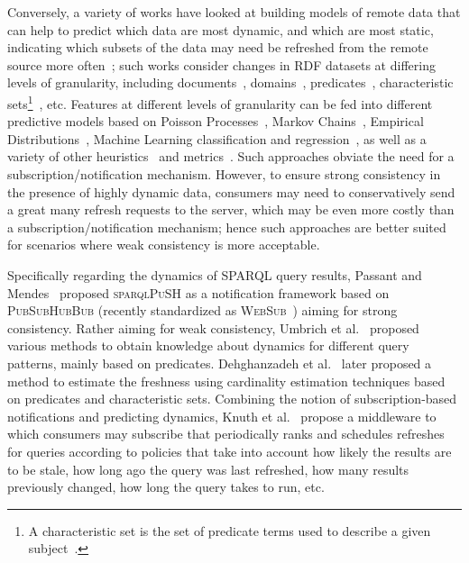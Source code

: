 \documentclass[runningheads]{llncs}
\begin{document}
Conversely, a variety of works have looked at building models of remote data that can help to predict which data are most dynamic, and which are most static, indicating which subsets of the data may need be refreshed from the remote source more often~\cite{PassantM10,TrampFEA10,UmbrichHHPD10,UmbrichKL10,KaferAUOH13,DividinoSGG13,NishiokaS16,GonzalezH18}; such works consider changes in RDF datasets at differing levels of granularity, including documents~\cite{KaferAUOH13}, domains~\cite{KaferAUOH13,NishiokaS16,NishiokaS17}, predicates~\cite{KaferAUOH13,NishiokaS17}, characteristic sets\footnote{A characteristic set is the set of predicate terms used to describe a given subject~\cite{NeumannM11}.}~\cite{NishiokaS16,GonzalezH18}, etc. Features at different levels of granularity can be fed into different predictive models based on Poisson Processes~\cite{UmbrichHHPD10}, Markov Chains~\cite{UmbrichMP15}, Empirical Distributions~\cite{NeumaierU16}, Machine Learning classification and regression~\cite{NishiokaS17,GonzalezH18}, as well as a variety of other heuristics~\cite{AliciAOCU12,UmbrichMP15,KnuthHS16} and metrics~\cite{DividinoGS15,KnuthHS16,AkhtarAL17}. Such approaches obviate the need for a subscription/notification mechanism. However, to ensure strong consistency in the presence of highly dynamic data, consumers may need to conservatively send a great many refresh requests to the server, which may be even more costly than a subscription/notification mechanism; hence such approaches are better suited for scenarios where weak consistency is more acceptable.


%  

Specifically regarding the dynamics of SPARQL query results, Passant and Mendes~\cite{PassantM10} proposed \textsc{sparqlPuSH} as a notification framework based  on \textsc{PubSubHubBub} (recently standardized as \textsc{WebSub}~\cite{webSub18}) aiming for strong consistency. Rather aiming for weak consistency, Umbrich et al.~\cite{UmbrichKHP12,UmbrichKPPH12,ekawUmbrichKHP12} proposed various methods to obtain knowledge about dynamics for different query patterns, mainly based on predicates. Dehghanzadeh et al.~\cite{DehghanzadehPKUHD14} later proposed a method to estimate the freshness using cardinality estimation techniques based on predicates and characteristic sets. Combining the notion of subscription-based notifications and predicting dynamics, Knuth et al.~\cite{KnuthHS16} propose a middleware to which consumers may subscribe that periodically ranks and schedules refreshes for queries according to policies that take into account how likely the results are to be stale, how long ago the query was last refreshed, how many results previously changed, how long the query takes to run, etc. 
\end{document}
